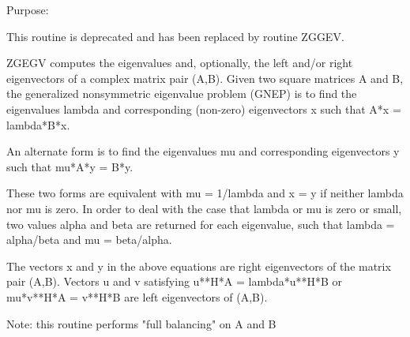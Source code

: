  \begin{DoxyParagraph}{Purpose\+: }
\begin{DoxyVerb} This routine is deprecated and has been replaced by routine ZGGEV.

 ZGEGV computes the eigenvalues and, optionally, the left and/or right
 eigenvectors of a complex matrix pair (A,B).
 Given two square matrices A and B,
 the generalized nonsymmetric eigenvalue problem (GNEP) is to find the
 eigenvalues lambda and corresponding (non-zero) eigenvectors x such
 that
    A*x = lambda*B*x.

 An alternate form is to find the eigenvalues mu and corresponding
 eigenvectors y such that
    mu*A*y = B*y.

 These two forms are equivalent with mu = 1/lambda and x = y if
 neither lambda nor mu is zero.  In order to deal with the case that
 lambda or mu is zero or small, two values alpha and beta are returned
 for each eigenvalue, such that lambda = alpha/beta and
 mu = beta/alpha.

 The vectors x and y in the above equations are right eigenvectors of
 the matrix pair (A,B).  Vectors u and v satisfying
    u**H*A = lambda*u**H*B  or  mu*v**H*A = v**H*B
 are left eigenvectors of (A,B).

 Note: this routine performs "full balancing" on A and B\end{DoxyVerb}
 
\end{DoxyParagraph}

